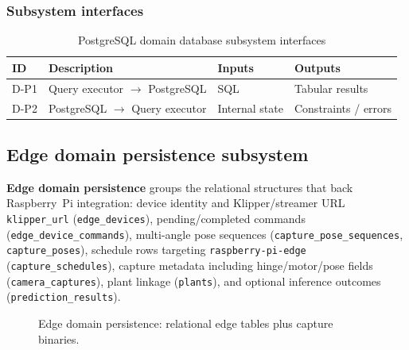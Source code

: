 \subsubsection{Subsystem interfaces}
\begin{table}[H]
\centering
\small
\begin{tabular}{|p{0.85cm}|p{3.5cm}|p{3.0cm}|p{3.5cm}|}
\hline
\textbf{ID} & \textbf{Description} & \textbf{Inputs} & \textbf{Outputs} \\
\hline
D-P1 & Query executor $\rightarrow$ PostgreSQL & SQL & Tabular results \\
\hline
D-P2 & PostgreSQL $\rightarrow$ Query executor & Internal state & Constraints / errors \\
\hline
\end{tabular}
\caption{PostgreSQL domain database subsystem interfaces}
\end{table}

\subsection{Edge domain persistence subsystem}

\textbf{Edge domain persistence} groups the relational structures that back Raspberry~Pi integration: device identity and Klipper/streamer URL \texttt{klipper\_url} (\texttt{edge\_devices}), pending/completed commands (\texttt{edge\_device\_commands}), multi-angle pose sequences (\texttt{capture\_pose\_sequences}, \texttt{capture\_poses}), schedule rows targeting \texttt{raspberry-pi-edge} (\texttt{capture\_schedules}), capture metadata including hinge/motor/pose fields (\texttt{camera\_captures}), plant linkage (\texttt{plants}), and optional inference outcomes (\texttt{prediction\_results}).

\begin{figure}[H]
\centering
{}
\caption{Edge domain persistence: relational edge tables plus capture binaries.}
\label{fig:data-edge}
\end{figure}

